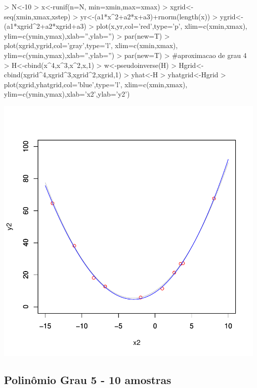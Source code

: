 \documentclass{article}
\begin{document}
\begin{Schunk}
\begin{Sinput}
>   N<-10
>   x<-runif(n=N, min=xmin,max=xmax)
>   xgrid<-seq(xmin,xmax,xstep)
>   yr<-(a1*x^2+a2*x+a3)+rnorm(length(x))
>   ygrid<-(a1*xgrid^2+a2*xgrid+a3)
>   plot(x,yr,col='red',type='p', xlim=c(xmin,xmax), ylim=c(ymin,ymax),xlab='',ylab='')
>   par(new=T)
>   plot(xgrid,ygrid,col='gray',type='l', xlim=c(xmin,xmax), ylim=c(ymin,ymax),xlab='',ylab='')
>   par(new=T)
>   #aproximacao de grau 4
>   H<-cbind(x^4,x^3,x^2,x,1)
>   w<-pseudoinverse(H) %
>   Hgrid<-cbind(xgrid^4,xgrid^3,xgrid^2,xgrid,1)
>   yhat<-H%
>   yhatgrid<-Hgrid%
>   plot(xgrid,yhatgrid,col='blue',type='l', xlim=c(xmin,xmax), ylim=c(ymin,ymax),xlab='x2',ylab='y2')
\end{Sinput}
\end{Schunk}
\includegraphics{aproximacao_polinomial-005}

\newpage
\subsection{Polinômio Grau 5 - 10 amostras}
\end{document}
